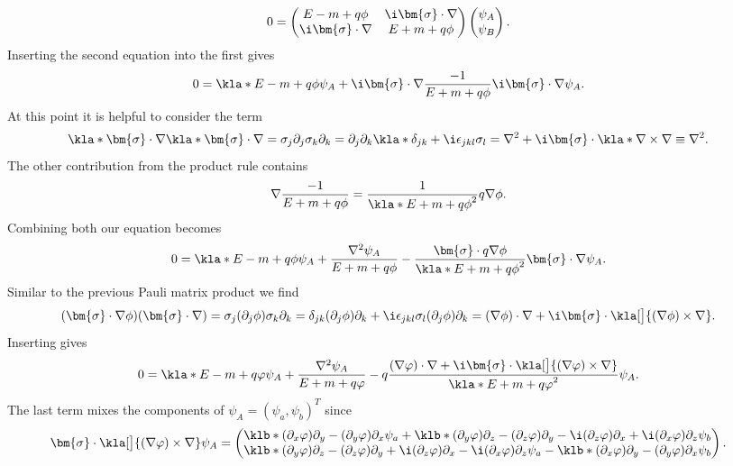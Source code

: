 \documentclass[english, parskip=full]{scrartcl}
\begin{document}
\begin{align}
0 &= \begin{pmatrix}
E-m + q\phi & \i\bm{\sigma}\cdot\nabla \\ \i\bm{\sigma}\cdot\nabla & E + m + q\phi
\end{pmatrix} \begin{pmatrix}
\psi_A \\ \psi_B
\end{pmatrix}.
\end{align}
Inserting the second equation into the first gives
\begin{align}
0 &= \kla*{E-m+q\phi}\psi_A + \i\bm{\sigma}\cdot\nabla \frac{-1}{E+m+q\phi} \i\bm{\sigma}\cdot\nabla \psi_A.
\end{align}
At this point it is helpful to consider the term
\begin{align}
\kla*{\bm{\sigma}\cdot\nabla} \kla*{\bm{\sigma}\cdot\nabla} &= \sigma_j\partial_j\sigma_k\partial_k = \partial_j\partial_k \kla*{\delta_{jk} + \i \epsilon_{jkl} \sigma_l} = \nabla^2 + \i \bm{\sigma} \cdot \kla*{\nabla \times \nabla} \equiv \nabla^2.
\end{align}
The other contribution from the product rule contains
\begin{align}
\nabla \frac{-1}{E+m+q\phi} &= \frac{1}{\kla*{E+m+q\phi}^2} q\nabla\phi.
\end{align}
Combining both our equation becomes
\begin{align}
0 &= \kla*{E-m+q\phi}\psi_A + \frac{\nabla^2\psi_A}{E+m+q\phi} - \frac{\bm{\sigma}\cdot q\nabla\phi}{\kla*{E+m+q\phi}^2} \bm{\sigma} \cdot \nabla\psi_A.
\end{align}
Similar to the previous Pauli matrix product we find
\begin{align}
(\bm{\sigma} \cdot \nabla\phi) (\bm{\sigma} \cdot \nabla) &= \sigma_j(\partial_j \phi) \sigma_k \partial_k = \delta_{jk} (\partial_j\phi)\partial_k + \i \epsilon_{jkl} \sigma_l (\partial_j\phi) \partial_k = (\nabla \phi) \cdot \nabla + \i \bm{\sigma} \cdot \kla[\big]{(\nabla\phi) \times \nabla}.
\end{align}
Inserting gives
\begin{align}
0 &= \kla*{E-m+q\varphi}\psi_A + \frac{\nabla^2\psi_A}{E+m+q\varphi} - q \frac{(\nabla\varphi) \cdot \nabla + \i \bm{\sigma} \cdot \kla[\big]{(\nabla\varphi) \times \nabla} }{\kla*{E+m+q\varphi}^2} \psi_A.
\end{align}
The last term mixes the components of $\psi_A = (\psi_a, \psi_b)^T$ since
\begin{align}
\bm{\sigma} \cdot \kla[\big]{(\nabla\varphi) \times \nabla} \psi_A &= \begin{pmatrix}
\klb*{(\partial_x\varphi) \partial_y - (\partial_y\varphi) \partial_x} \psi_a + \klb*{(\partial_y\varphi) \partial_z - (\partial_z\varphi) \partial_y - \i (\partial_z\varphi) \partial_x + \i (\partial_x \varphi) \partial_z} \psi_b \\
\klb*{(\partial_y\varphi) \partial_z - (\partial_z\varphi) \partial_y + \i (\partial_z\varphi) \partial_x - \i (\partial_x \varphi) \partial_z} \psi_a -\klb*{(\partial_x\varphi) \partial_y - (\partial_y\varphi) \partial_x} \psi_b
\end{pmatrix}.
\end{align}
\end{document}
